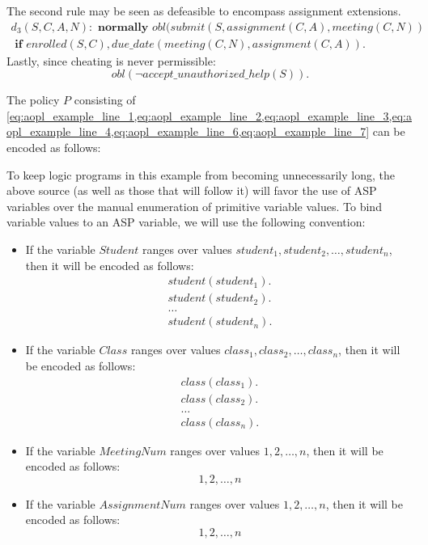 The second rule may be seen as defeasible to encompass assignment extensions.
\begin{multline}
    \label{eq:aopl_example_line_6}
    d_3(S,C,A,N): \textbf{ normally } obl(submit(S,assignment(C,A),meeting(C,N)) \\ \textbf{ if } enrolled(S,C), due\_date(meeting(C,N), assignment(C,A)).
\end{multline}
Lastly, since cheating is never permissible:
\begin{equation}
    \label{eq:aopl_example_line_7}
    obl(\neg accept\_unauthorized\_help(S)).
\end{equation}

The policy $P$ consisting of \cref{eq:aopl_example_line_1,eq:aopl_example_line_2,eq:aopl_example_line_3,eq:aopl_example_line_4,eq:aopl_example_line_6,eq:aopl_example_line_7} can be encoded as follows\footnotemark:



To keep logic programs in this example from becoming unnecessarily long, the above source (as well as those that will follow it) will favor the use of ASP variables over the manual enumeration of primitive variable values.
To bind variable values to an ASP variable, we will use the following convention:
\begin{itemize}
    \item If the variable $Student$ ranges over values $student_1, student_2, \dots, student_n$, then it will be encoded as follows:
        \begin{gather}
            student(student_1). \\
            student(student_2). \\
            \dots \\
            student(student_n).
        \end{gather}
    \item If the variable $Class$ ranges over values $class_1, class_2, \dots, class_n$, then it will be encoded as follows:
        \begin{gather}
            class(class_1). \\
            class(class_2). \\
            \dots \\
            class(class_n).
        \end{gather}
    \item If the variable $MeetingNum$ ranges over values $1, 2, \dots, n$, then it will be encoded as follows:
        \begin{equation}
            1, 2, \dots, n
        \end{equation}
    \item If the variable $AssignmentNum$ ranges over values $1, 2, \dots, n$, then it will be encoded as follows:
        \begin{equation}
            1, 2, \dots, n
        \end{equation}
\end{itemize}

